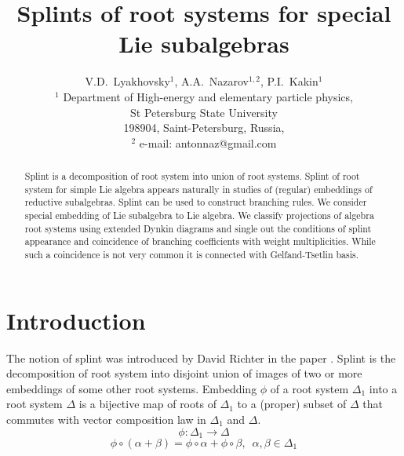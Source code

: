 \documentclass{article}
\begin{document}
\title{Splints of root systems for special Lie subalgebras} %



\author{V.D.~Lyakhovsky$^1$, A.A.~Nazarov$^{1,2}$, P.I.~Kakin$^{1}$\\
  {\small $^1$ Department of High-energy and elementary particle physics,}\\ {\small St Petersburg State University}\\
  {\small 198904, Saint-Petersburg, Russia,}\\
  {\small $^{2}$ e-mail: antonnaz@gmail.com}}
\date{}
\maketitle

\begin{abstract}
  Splint is a decomposition of root system into union of root systems. Splint of root system for
  simple Lie algebra appears naturally in studies of (regular) embeddings of reductive subalgebras.
  Splint can be used to construct branching rules. We consider special embedding of Lie subalgebra
  to Lie algebra. We classify projections of algebra root systems using extended Dynkin diagrams and
  single out the conditions of splint appearance and coincidence of branching coefficients with
  weight multiplicities. While such a coincidence is not very common it is connected with Gelfand-Tsetlin basis. 
\end{abstract}

\section{Introduction}
\label{sec:introduction}

The notion of splint was introduced by David Richter in the paper \cite{richter2008splints}. Splint
is the decomposition of root system into disjoint union of images of two or more embeddings of some
other root systems. Embedding $\phi$ of a root system $\Delta_1$ into a root system $\Delta$ is a
bijective map of roots of $\Delta_{1}$ to a (proper) subset of $\Delta$ that commutes with vector
composition law in $\Delta_{1}$ and $\Delta$.
\begin{equation*}
\phi:\Delta_1 \longrightarrow \Delta
\end{equation*}
\begin{equation*}
\phi \circ (\alpha + \beta) =\phi \circ \alpha + \phi \circ \beta,
\,\,\, \alpha,\beta \in \Delta_1
\end{equation*}
\end{document}
